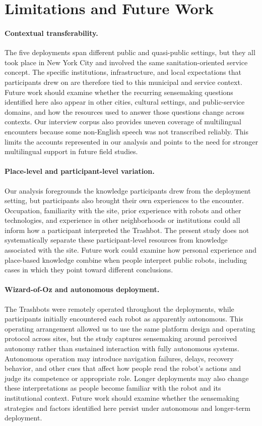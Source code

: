 \section{Limitations and Future Work}
\label{sec:limitations}

\paragraph{Contextual transferability.}
The five deployments span different public and quasi-public settings, but they all took place in New York City and involved the same sanitation-oriented service concept. The specific institutions, infrastructure, and local expectations that participants drew on are therefore tied to this municipal and service context. Future work should examine whether the recurring sensemaking questions identified here also appear in other cities, cultural settings, and public-service domains, and how the resources used to answer those questions change across contexts. Our interview corpus also provides uneven coverage of multilingual encounters because some non-English speech was not transcribed reliably. This limits the accounts represented in our analysis and points to the need for stronger multilingual support in future field studies.

\paragraph{Place-level and participant-level variation.}
Our analysis foregrounds the knowledge participants drew from the deployment setting, but participants also brought their own experiences to the encounter. Occupation, familiarity with the site, prior experience with robots and other technologies, and experience in other neighborhoods or institutions could all inform how a participant interpreted the Trashbot. The present study does not systematically separate these participant-level resources from knowledge associated with the site. Future work could examine how personal experience and place-based knowledge combine when people interpret public robots, including cases in which they point toward different conclusions.

\paragraph{Wizard-of-Oz and autonomous deployment.}
The Trashbots were remotely operated throughout the deployments, while participants initially encountered each robot as apparently autonomous. This operating arrangement allowed us to use the same platform design and operating protocol across sites, but the study captures sensemaking around perceived autonomy rather than sustained interaction with fully autonomous systems. Autonomous operation may introduce navigation failures, delays, recovery behavior, and other cues that affect how people read the robot's actions and judge its competence or appropriate role. Longer deployments may also change these interpretations as people become familiar with the robot and its institutional context. Future work should examine whether the sensemaking strategies and factors identified here persist under autonomous and longer-term deployment.